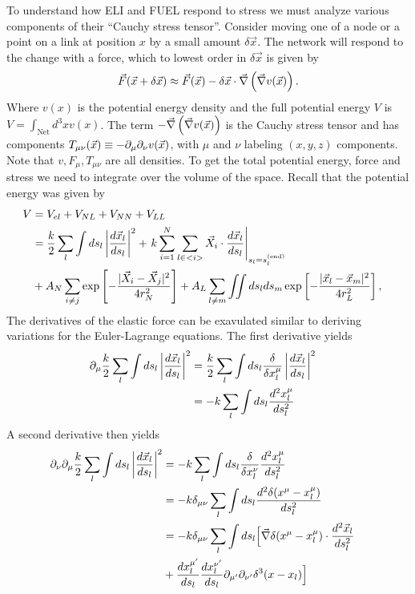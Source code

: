 \documentclass[nofootinbib,preprint,floatfix,titlepage,endfloats,superscriptaddress]{revtex4} %
\begin{document}
To understand how ELI and FUEL respond to stress we must analyze various components of their ``Cauchy stress tensor''. 
Consider moving one of a node or a point on a link at position $x$ by a small amount $\delta \vec{x}$.
The network will respond to the change with a force, which to lowest order in $\delta \vec{x}$ is given by
\begin{equation}
\vec{F} (\vec{x}+\delta \vec{x}) \approx %
\vec{F} (\vec{x})-\delta \vec{x}\cdot  \vec{\del} \pr{\vec{\del} v (\vec{x})}.\label{eq:dF}    
\end{equation}
Where $v(x)$ is the potential energy density and the full potential energy $V$ is $V = \int_\mathrm{Net} d^3x v(x)$. 
The term $-\vec{\nabla} \left(\vec{\nabla} v (\vec{x})\right)$ is the Cauchy stress tensor and has components $T_{\mu\nu}(\vec{x}) \equiv -\partial_\mu\partial_\nu v(\vec{x})$, with $\mu$ and $\nu$ labeling $(x,y,z)$ components. 
Note that $v,F_\mu,T_{\mu\nu}$ are all densities. 
To get the total potential energy, force and stress we need to integrate over the volume of the space. 
Recall that the potential energy was given by 
\begin{align}
    V &= V_{el} + V_{NL} +V_{NN} + V_{LL} \cr 
    &= {k\over 2}\sum_l\int ds_l \left|{d\vec{x}_l\over ds_l} \right|^2 + 
    \left. k\sum_{i=1}^N  \sum_{l\in <i>}  \vec{X}_i \cdot{d\vec{x}_l%
    \over ds_l}\right|_{s_l = s_l^{(\mathrm{end})}}
    \cr
    &+ A_N\sum_{i\ne j}  \exp\left[- {|\vec{X}_i-\vec{X}_j|^2 \over 4r_N^2}\right]+A_L\sum_{l\ne m} \iint ds_lds_m 
    \exp\left[- {|\vec{x}_l-\vec{x}_m|^2 \over 4 r_L^2}\right] ,
 \label{eq:Vfull1}
\end{align}
The derivatives of the elastic force can be exavulated similar to deriving variations for the Euler-Lagrange equations. 
The first derivative yields
\begin{align}
    \partial_\mu {k\over 2}\sum_l\int ds_l \left|{d\vec{x}_l\over ds_l} \right|^2 & = {k\over 2}\sum_l\int ds_l {\delta \over \delta x_l^\mu} \left|{d\vec{x}_l\over ds_l} \right|^2 \cr
    & = -{k}\sum_l\int ds_l {d^2 x_l^\mu\over ds_l^2} 
\end{align}
A second derivative then yields
\begin{align}
    \ro_\nu \ro_\mu {k\over 2}\sum_l\int ds_l \left|{d\vec{x}_l\over ds_l} \right|^2 
    & = -{k}\sum_l\int ds_l {\delta \over \delta x_l^\nu} {d^2 x_l^\mu\over ds_l^2} \cr 
    & = -{k}\delta_{\mu\nu} \sum_l\int ds_l {d^2 \delta(x^\mu-x_l^\mu )\over ds_l^2} \cr
    & = -{k}\delta_{\mu\nu} \sum_l\int ds_l\Big[ \vec{\del} \delta(x^\mu-x_l^\mu) \cdot {d^2 \vec{x}_l\over ds_l^2} \cr 
    & + {d x_l^{\mu'}\over ds_l}{d x_l^{\nu'}\over ds_l} \ro_{\mu'}\ro_{\nu'} \delta^3(x-x_l)  \Big] %
\end{align}
\end{document}
